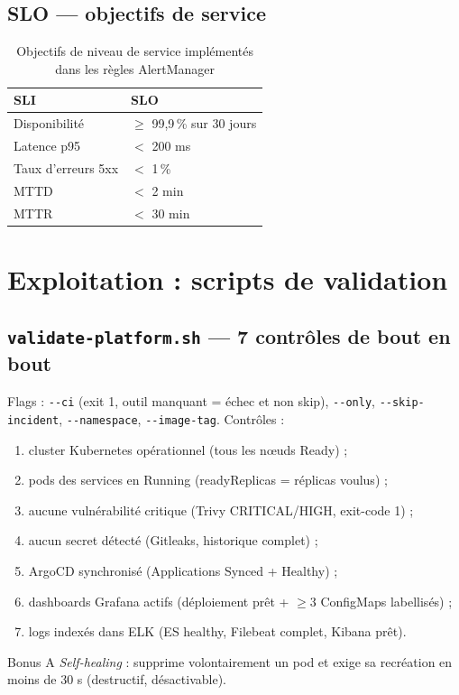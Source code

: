 \documentclass[11pt,a4paper]{article}
\begin{document}
\subsection{SLO --- objectifs de service}\label{sec:slo-table}
\begin{table}[h!]
\centering
\begin{tabular}{@{}ll@{}}
\toprule
\textbf{SLI} & \textbf{SLO} \\
\midrule
Disponibilité & $\geq$ 99{,}9\,\% sur 30 jours \\
Latence p95 & $<$ 200 ms \\
Taux d'erreurs 5xx & $<$ 1\,\% \\
MTTD & $<$ 2 min \\
MTTR & $<$ 30 min \\
\bottomrule
\end{tabular}
\caption{Objectifs de niveau de service implémentés dans les règles AlertManager}
\end{table}

\section{Exploitation : scripts de validation}

\subsection{\texttt{validate-platform.sh} --- 7 contrôles de bout en bout}
Flags : \texttt{-{}-ci} (exit 1, outil manquant = échec et non skip), \texttt{-{}-only}, \texttt{-{}-skip-incident}, \texttt{-{}-namespace}, \texttt{-{}-image-tag}. Contrôles :
\begin{enumerate}[itemsep=1pt]
  \item cluster Kubernetes opérationnel (tous les nœuds Ready) ;
  \item pods des services en Running (readyReplicas = réplicas voulus) ;
  \item aucune vulnérabilité critique (Trivy CRITICAL/HIGH, exit-code 1) ;
  \item aucun secret détecté (Gitleaks, historique complet) ;
  \item ArgoCD synchronisé (Applications Synced + Healthy) ;
  \item dashboards Grafana actifs (déploiement prêt + $\geq$3 ConfigMaps labellisés) ;
  \item logs indexés dans ELK (ES healthy, Filebeat complet, Kibana prêt).
\end{enumerate}
Bonus A \emph{Self-healing} : supprime volontairement un pod et exige sa recréation en moins de 30 s (destructif, désactivable).
\end{document}
